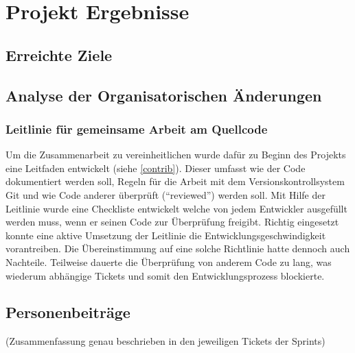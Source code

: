 
\chapter{Projekt Ergebnisse}

\section{Erreichte Ziele}

\section{Analyse der Organisatorischen Änderungen}

\subsection{Leitlinie für gemeinsame Arbeit am Quellcode}
Um die Zusammenarbeit zu vereinheitlichen wurde dafür zu Beginn des Projekts eine Leitfaden entwickelt (siehe \ref{contrib}).
Dieser umfasst wie der Code dokumentiert werden soll, Regeln für die Arbeit mit dem Versionskontrollsystem Git 
und wie Code anderer überprüft (\enquote{reviewed}) werden soll. Mit Hilfe der Leitlinie wurde eine Checkliste entwickelt 
welche von jedem Entwickler ausgefüllt werden muss, wenn er seinen Code zur Überprüfung freigibt. Richtig
eingesetzt konnte eine aktive Umsetzung der Leitlinie die Entwicklungsgeschwindigkeit vorantreiben. Die 
Übereinstimmung auf eine solche Richtlinie hatte dennoch auch Nachteile. Teilweise dauerte die Überprüfung von 
anderem Code zu lang, was wiederum abhängige Tickets und somit den Entwicklungsprozess blockierte.

\section{Personenbeiträge}
(Zusammenfassung genau beschrieben in den jeweiligen Tickets der Sprints)
